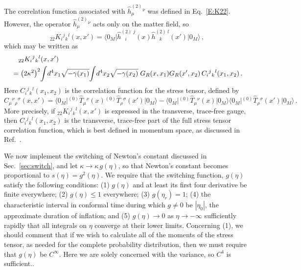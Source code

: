 \documentclass[preprint,prd,showpacs,superscriptaddress]{revtex4}
\begin{document}
The correlation function associated with $\hat{h }^{(2)}_{\mu}{}^{\nu}$ was defined in Eq.~\eqref{E:K22}. 
However, the operator  $\hat{h }^{(2)}_{\mu}{}^{\nu}$ acts only on the matter field, so
\begin{equation}
{}_{22}K_{i}{}^{j}{}_{k}{}^{l}(x,x')=\langle0_{M}\vert\hat{h}^{(2)\;j}_{\;\;\; i}(x)\hat{h}^{(2)\;l}_{\;\;\; k}(x')\vert0_{M}\rangle\,,
\label{E:K22-1}
\end{equation}
which may be written as
\begin{align}\label{E:K22-2}
	&\quad{}_{22}K_{i}{}^{j}{}_{k}{}^{l}(x,x')\notag\\
	&=\bigl(2\kappa^{2}\bigr)^{2}\!\int\!d^{4}x_{1}\sqrt{-\gamma(x_{1})}\!\int\!d^{4}x_{2}\sqrt{-\gamma(x_{2})}\;
	G_{R}(x,x_{1})G_{R}(x',x_{2})\,C_{i}{}^{j}{}_{k}{}^{l}(x_{1},x_{2})\,.
\end{align}
Here $C_{i}{}^{j}{}_{k}{}^{l}(x_{1},x_{2})$ is the correlation function for the stress tensor, defined by
\begin{equation}
	C_{\mu}{}^{\nu}{}_{\rho}{}^{\sigma}(x,x')=\langle0_{M}\vert{}^{(0)}\hat{T}_{\mu}{}^{\nu}(x){}^{(0)}\hat{T}_{\rho}{}^{\sigma}(x')\vert0_{M}
	\rangle-\langle0_{M}\vert{}^{(0)}\hat{T}_{\mu}{}^{\nu}(x)\vert0_{M}\rangle\langle0_{M}
	\vert{}^{(0)}\hat{T}_{\rho}{}^{\sigma}(x')\vert0_{M}\rangle\,.
\end{equation}
More precisely, if ${}_{22}K_{i}{}^{j}{}_{k}{}^{l}(x,x')$ is expressed in the transverse, trace-free gauge, then
$C_{i}{}^{j}{}_{k}{}^{l}(x_{1},x_{2})$ is the transverse, trace-free part of the full stress tensor correlation function,
which is best defined in momentum space, as discussed in Ref.~\cite{WHFN11}.

We now implement the switching of Newton's constant discussed in Sec.~\ref{sec:switch}, and let 
$\kappa\to\kappa\,g(\eta)$, so that Newton's constant becomes proportional to $s(\eta) = g^2(\eta)$. We
require that the switching function, $g(\eta)$ satisfy the following conditions: (1) $g(\eta)$ and at least its first
four derivative be finite everywhere; (2) $g(\eta) \leq 1$ everywhere; (3) $g(\eta_r) = 1$; (4) the characteristic interval
in conformal time during which $g\not=0$ be $|\eta_0|$, the approximate duration of inflation;
and (5) $g(\eta) \rightarrow 0$
as $\eta \rightarrow -\infty$ sufficiently rapidly that all integrals on $\eta$ converge at their lower limits.   Concerning (1), we should comment
that if we wish to calculate all of the moments of the stress tensor, as needed for the complete probability distribution, then we must
require that $g(\eta)$ be $C^\infty$. Here we are solely concerned with the variance, so $C^4$ is sufficient..
\end{document}

